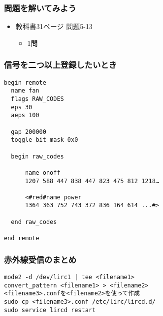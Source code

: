 \begin{frame}
    \frametitle{問題を解いてみよう}
    \begin{itemize}
        \item 教科書31ページ 問題5-13
        \begin{itemize}
            \item 1問
        \end{itemize}
    \end{itemize}
\end{frame}

\begin{frame}[fragile]
    \frametitle{信号を二つ以上登録したいとき}
\begin{lstlisting}[caption=２つの信号を登録するときのtemplate.lircd.comf,label=２つの信号を登録するときのtemplate.lircd.comf]
begin remote
  name fan
  flags RAW_CODES
  eps 30
  aeps 100

  gap 200000
  toggle_bit_mask 0x0

  begin raw_codes

      name onoff
      1207 588 447 838 447 823 475 812 1218…

      <#red#name power
      1364 363 752 743 372 836 164 614 ...#>

  end raw_codes

end remote
\end{lstlisting}
\end{frame}

\begin{frame}[fragile]
    \frametitle{赤外線受信のまとめ}
\begin{lstlisting}
mode2 -d /dev/lirc1 | tee <filename1>
convert_pattern <filename1> > <filename2>
<filename3>.confを<filename2>を使って作成
sudo cp <filename3>.conf /etc/lirc/lircd.d/
sudo service lircd restart
\end{lstlisting}
\end{frame}

